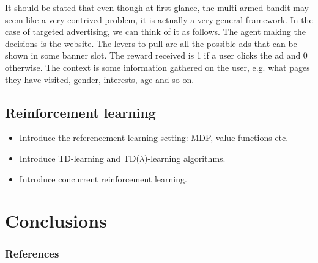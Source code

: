 \documentclass{article} %
\begin{document}
It should be stated that even though at first glance, the multi-armed bandit
may seem like a very contrived problem, it is actually a very general
framework. In the case of targeted advertising, we can think of it as follows.
The agent making the decisions is the website. The levers to pull are all the
possible ads that can be shown in some banner slot. The reward received is 1 if
a user clicks the ad and 0 otherwise. The context is some information gathered
on the user, e.g. what pages they have visited, gender, interests, age and so
on.


\subsection{Reinforcement learning}

\begin{itemize}
  \item{Introduce the referencement learning setting: MDP, value-functions
    etc.}
  \item{Introduce TD-learning and TD($\lambda$)-learning algorithms.}
  \item{Introduce concurrent reinforcement learning.}
\end{itemize}

\section{Conclusions}

\subsubsection*{References}
\nocite{*}

\printbibliography[heading=none]
\end{document}
